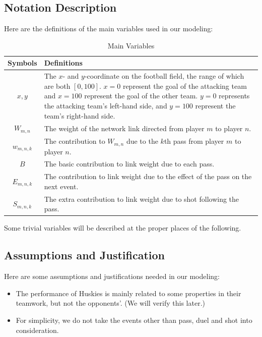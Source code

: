 \documentclass[12pt]{article}
\begin{document}

\subsection{Notation Description}
Here are the definitions of the main variables used in our modeling:
\begin{table}[h]
    \centering
    \caption{Main Variables}
    \label{Variables}
    \begin{tabular}{cp{12cm}}
        \toprule
        Symbols           & Definitions \\
		\midrule
		$x,y$ & The $x$- and $y$-coordinate on the football field, the range of which are both $[0,100]$. $x=0$ represent the goal of the attacking team and $x=100$ represent the goal of the other team. $y=0$ represents the attacking team's left-hand side, and $y=100$ represent the team's right-hand side.\\
		$W_{m,n}$               & The weight of the network link directed from player $m$ to player $n$. \\
		$w_{m,n,k}$ & The contribution to $W_{m,n}$ due to the $k$th pass from player $m$ to player $n$. \\
		$B$ & The basic contribution to link weight due to each pass. \\
		$E_{m,n,k}$ & The contribution to link weight due to the effect of the pass on the next event. \\
		$S_{m,n,k}$ & The extra contribution to link weight due to shot following the pass.\\
        \bottomrule
    \end{tabular}
\end{table}

\newpage

Some trivial variables will be described at the proper places of the following.



\subsection{Assumptions and Justification}
Here are some assumptions and justifications needed in our modeling:
\begin{itemize}
	\item The performance of Huskies is mainly related to some properties in their teamwork, but not the opponents'. (We will verify this later.)
	\item For simplicity, we do not take the events other than pass, duel and shot into consideration.
\end{itemize}
\end{document}
